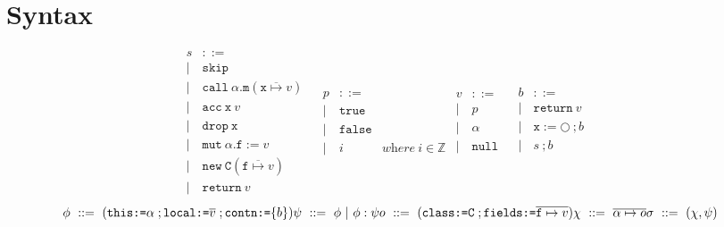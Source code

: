 \documentclass[12pt]{article}
\date{}
\begin{document}
\maketitle

\section{Syntax}
\begin{figure}[h]
$$
\begin{array}{llr}
s & ::= &\\ 
| & \texttt{skip} &\\
| & \texttt{call}\ \alpha.\texttt{m}(\overline{\texttt{x} \mapsto v}) &\\ 
| & \texttt{acc}\ \texttt{x}\ v &\\
| & \texttt{drop}\ \texttt{x} &\\
| & \texttt{mut}\ \alpha.\texttt{f} := v &\\
| & \texttt{new}	\ \texttt{C}(\overline{\texttt{f} \mapsto v}) &\\
| & \texttt{return}\ v
\end{array}
\begin{array}{llr}
p & ::= &\\ 
| & \texttt{true} &\\
| & \texttt{false} &\\
| & i & \textit{where}\ i \in \mathbb{Z}
\end{array}
\begin{array}{llr}
v & ::= &\\ 
| & p &\\
| & \alpha\\
| & \texttt{null}
\end{array}
\begin{array}{llr}
b & ::= &\\ 
| & \texttt{return}\ v &\\
| & \texttt{x} := \bigcirc\ ; b&\\
| & s\ ; b\\
\end{array}
$$
\[
\phi\ ::=\ (\texttt{this:=}\alpha\; ;\texttt{local:=}\overline{v}\; ; \texttt{contn:=}\{b\})\\
\psi\ ::=\ \phi\ |\ \phi : \psi\\
o\ ::=\ (\texttt{class:=C}\; ; \texttt{fields:=}\overline{\texttt{f}\mapsto v})\\
\chi\ ::=\ \overline{\alpha \mapsto o}\\
\sigma\ ::=\ (\chi, \psi)\\
\]
\end{figure}
\end{document}
